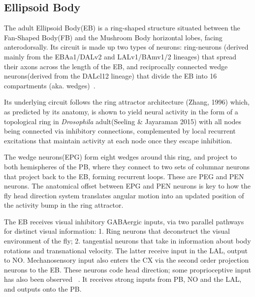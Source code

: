 


    \subsection{Ellipsoid Body}
    The adult Ellipsoid Body(EB) is a ring-shaped structure situated between the Fan-Shaped Body(FB) and the Mushroom Body horizontal lobes, facing anterodorsally. Its circuit is made up two types of neurons: ring-neurons (derived mainly from the EBAa1/DALv2 and LALv1/BAmv1/2 lineages) that spread their axons across the length of the EB, and reciprocally connected wedge neurons(derived from the DALcl12 lineage) that divide the EB into 16 compartments (aka. wedges)~\citep{omoto2018neuronal}. 

    Its underlying circuit follows the ring attractor architecture (Zhang, 1996) which, as predicted by its anatomy, is shown to yield neural activity in the form of a topological ring in \textit{Drosophila} adult(Seeling \& Jayaraman 2015) with all nodes being connected via inhibitory connections, complemented by local recurrent excitations that maintain activity at each node once they escape inhibition.%

    The wedge neurons(EPG) form eight wedges around this ring, and project to both hemispheres of the PB, where they connect to two sets of columnar neurons that project back to the EB, forming recurrent loops. These are PEG and PEN neurons. The anatomical offset between EPG and PEN neurons is key to how the fly head direction system translates angular motion into an updated position of the activity bump in the ring attractor. 


    The EB receives visual inhibitory GABAergic inputs, via two parallel pathways for distinct visual information:
    1. Ring neurons that deconstruct the visual environment of the fly; 2. tangential neurons that take in information about body rotations and transnational velocity. The latter receive input in the LAL, output to NO.
    Mechanosensory input also enters the CX via the second order projection neurons to the EB. These neurons code head direction; some proprioceptive input has also been observed 
    ~\citep{hulse2021connectome}. It receives strong inputs from PB, NO and the LAL, and outputs onto the PB.  


